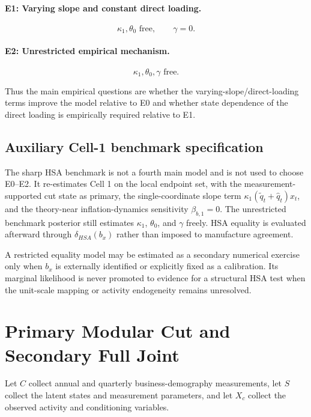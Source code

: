 \documentclass[11pt]{article}
\begin{document}
\paragraph{E1: Varying slope and constant direct loading.}
\begin{equation}
\kappa_1,\theta_0\text{ free},
\qquad
\gamma=0.
\end{equation}

\paragraph{E2: Unrestricted empirical mechanism.}
\begin{equation}
\kappa_1,\theta_0,\gamma\text{ free}.
\end{equation}

Thus the main empirical questions are whether the varying-slope/direct-loading terms improve the model relative to E0 and whether state dependence of the direct loading is empirically required relative to E1.

\subsection*{Auxiliary Cell-1 benchmark specification}
The sharp HSA benchmark is not a fourth main model and is not used to choose E0--E2. It re-estimates Cell 1 on the local endpoint set, with the measurement-supported cut state as primary, the single-coordinate slope term $\kappa_1(\tilde q_t+\hat q_t)x_t$, and the theory-near inflation-dynamics sensitivity $\beta_{b,1}=0$. The unrestricted benchmark posterior still estimates $\kappa_1$, $\theta_0$, and $\gamma$ freely. HSA equality is evaluated afterward through $\delta_{HSA}(b_x)$ rather than imposed to manufacture agreement.

A restricted equality model may be estimated as a secondary numerical exercise only when $b_x$ is externally identified or explicitly fixed as a calibration. Its marginal likelihood is never promoted to evidence for a structural HSA test when the unit-scale mapping or activity endogeneity remains unresolved.

\section{Primary Modular Cut and Secondary Full Joint}

Let $C$ collect annual and quarterly business-demography measurements, let $S$ collect the latent states and measurement parameters, and let $X_c$ collect the observed activity and conditioning variables.
\end{document}
